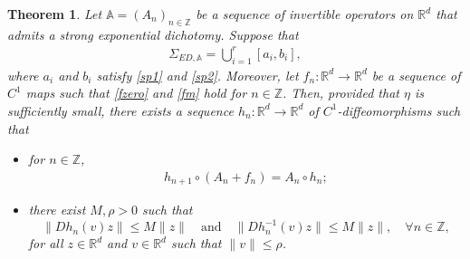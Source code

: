 \documentclass[reqno, a4paper, 10pt]{amsart}
\theoremstyle{plain}
\numberwithin{equation}{section}
\newtheorem{theorem}{Theorem}
\theoremstyle{remark}
\def\R{\mathbb{R}}
\def\Z{\mathbb{Z}}
\begin{document}







\begin{theorem}\label{Ap}
Let $\mathbb A=(A_n)_{n\in \Z}$ be a sequence of invertible operators on $\R^d$ that  admits a strong exponential dichotomy.
Suppose that 
\begin{align*}
\Sigma_{ED, \mathbb A}=\bigcup_{i=1}^r [a_i, b_i],
\end{align*}
where $a_i$ and $b_i$ satisfy \eqref{sp1} and \eqref{sp2}. Moreover, let $f_n\colon \R^d \to \R^d$ be a sequence of $C^1$ maps such that \eqref{fzero} and \eqref{fm} hold for $n\in\mathbb{Z}$.
Then, provided that $\eta$ is sufficiently small,  there exists a sequence $h_n\colon \R^d\to \R^d$ of $C^1$-diffeomorphisms such that
\begin{itemize}
\item for $n\in \Z$,
\begin{align}\label{con-hn}
h_{n+1} \circ (A_n+f_n)=A_n\circ h_n;
\end{align}
\item there exist $M, \rho>0$ such that
\begin{equation}\label{conj}
\|D h_n(v)z\| \le M\|z\| \quad \text{and} \quad \|Dh_n^{-1}(v)z\| \le M\|z\|, \quad \forall n\in \Z,
\end{equation}
for all  $z\in \R^d$ and $v\in\mathbb{R}^d$ such that $\|v\|\le \rho$.
\end{itemize}
\end{theorem}
\end{document}
